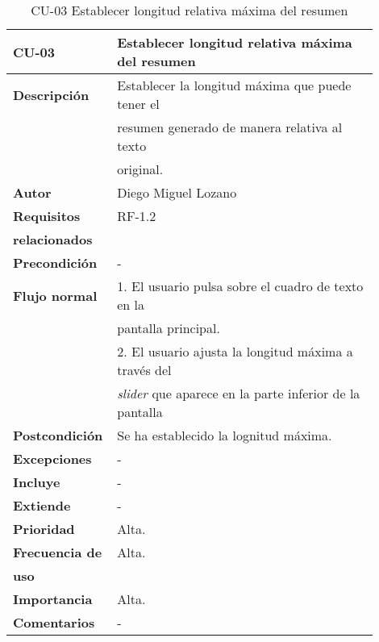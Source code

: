 \begin{longtable}{>{\raggedright}b{0.2\linewidth}>{\raggedright\arraybackslash}b{0.7\linewidth}}
	\toprule
	\textbf{CU-03} & \textbf{Establecer longitud relativa máxima del resumen} \\
	\toprule
	\endhead
	
	\toprule
	\caption{CU-03 Establecer longitud relativa máxima del resumen}
	\endfoot
	
	\small{\textbf{Descripción}} & Establecer la longitud máxima que puede tener el \\
	& resumen generado de manera relativa al texto \\ & original. \\
	\small{\textbf{Autor}} & Diego Miguel Lozano \\
	\small{\textbf{Requisitos}} & RF-1.2  \\
	\small{\textbf{relacionados}} & \\
	\small{\textbf{Precondición}} & - \\
	\small{\textbf{Flujo normal}} & \quad \small{1. El usuario pulsa sobre el cuadro de texto en la} \\
	& \qquad \small{pantalla principal.} \\
	& \quad \small{2. El usuario ajusta la longitud máxima a través del} \\
	& \qquad \small{\emph{slider} que aparece en la parte inferior de la pantalla} \\
	\small{\textbf{Postcondición}} & Se ha establecido la lognitud máxima. \\
	\small{\textbf{Excepciones}} & - \\
	\small{\textbf{Incluye}} & - \\
	\small{\textbf{Extiende}} & - \\
	\small{\textbf{Prioridad}} & Alta. \\
	\small{\textbf{Frecuencia de}} & Alta. \\
	\small{\textbf{uso}} & \\
	\small{\textbf{Importancia}} & Alta. \\
	\small{\textbf{Comentarios}} &  - \\
\end{longtable}



